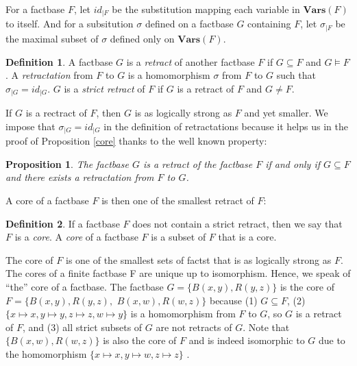 \documentclass{article}
\newtheorem{proposition}{Proposition}[section]
\theoremstyle{definition}
\newtheorem{definition}{Definition}[section]
\theoremstyle{remark}
\newcommand{\Vars}{\textbf{Vars}}
\begin{document}
For a factbase $F$, let $id_{|F}$ be the substitution mapping each variable in $\Vars(F)$ to itself. And for a subsitution $\sigma$ defined on a factbase $G$ containing $F$, let $\sigma_{|F}$ be the maximal subset of $\sigma$ defined only on $\Vars(F)$. 

\begin{definition}
A factbase $G$ is a \emph{retract} of another factbase $F$ if $G \subseteq F$ and $G \vDash F$. A \emph{retractation} from $F$ to $G$ is a homomorphism $\sigma$ from $F$ to $G$ such that $\sigma_{|G}=id_{|G}$. $G$ is a \emph{strict retract} of $F$ if $G$ is a retract of $F$ and $G \neq F$.
\end{definition}

If $G$ is a rectract of $F$, then $G$ is as logically strong as $F$ and yet smaller. We impose that $\sigma_{|G}=id_{|G}$ in the definition of retractations because it helps us in the proof of Proposition \ref{core} thanks to the well known property:


\begin{proposition} \label{retract}
The factbase $G$ is a retract of the factbase $F$ if and only if $G \subseteq F$  and there exists a retractation from $F$ to $G$.
\end{proposition}

A core of a factbase $F$ is then one of the smallest retract of $F$:

\begin{definition}
If a factbase $F$ does not contain a strict retract, then we say that $F$ is a \emph{core}. A \emph{core} of a factbase $F$ is a subset of $F$ that is a core.
\end{definition}

The core of $F$ is one of the smallest sets of factst that is as logically strong as $F$. The cores of a finite factbase F are unique up to isomorphism. Hence, we speak of ``the'' core of a factbase. The factbase $G = \{B(x,y),R(y,z)\}$ is the core of $F = \{B(x,y),R(y,z),$ $B(x,w),R(w,z)\}$ because (1) $G \subseteq F$, (2)
$\{x \mapsto x, y \mapsto y, z \mapsto z, w \mapsto y\}$ is a homomorphism from $F$ to $G$, so $G$ is a retract of $F$, and (3) all strict subsets of $G$ are not retracts of $G$. Note that $ \{B(x,w),R(w,z)\}$ is also the core of $F$ and is indeed isomorphic to $G$ due to the homomorphism $\{x \mapsto x, y \mapsto w, z \mapsto z\}$ .


\end{document}
